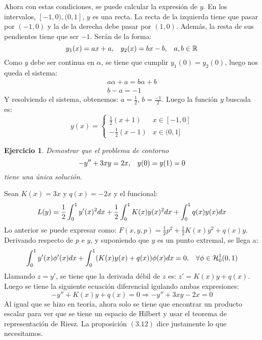 \documentclass[12pt]{article}
\newtheorem{ejercicio}{Ejercicio}
\theoremstyle{definition}
\theoremstyle{remark}
\begin{document}
Ahora con estas condiciones, se puede calcular la expresión de $y$. En los intervalos, $[-1,0),(0,1]$, $y$ es una recta. La recta de la izquierda tiene que pasar por $(-1,0)$ y la de la derecha debe pasar por $(1,0)$. Además, la resta de sus pendientes tiene que ser $-1$. Serán de la forma:
\[
y_1(x)=ax+a, \espacio y_2(x)=bx-b, \espacio a,b\in\R
\]
Como $y$ debe ser continua en $\alpha$, se tiene que cumplir $y_1(0)=y_2(0)$, luego nos queda el sistema:
\[
\begin{array}{l}
a\alpha+a=b\alpha+b\\
b-a=-1
\end{array}
\]
Y resolviendo el sistema, obtenemos: $a=\frac{1}{2}$, $b=\frac{-1}{2}$. Luego la función $y$ buscada es:
\[
y(x)=\left\{
\begin{array}{ll}
\frac{1}{2}(x+1) & x\in[-1,0]\\
-\frac{1}{2}(x-1) & x\in(0,1]
\end{array}
\right.
\]


\begin{ejercicio}
Demostrar que el problema de contorno
\[
-y''+3xy=2x, \espacio y(0)=y(1)=0
\]
tiene una única solución.
\end{ejercicio}


Sean $K(x)=3x$ y $q(x)=-2x$ y el funcional:
\[
L(y)=\frac{1}{2}\integral{0}{1}{y'(x)^2dx}+\frac{1}{2}\integral{0}{1}{K(x)y(x)^2dx}+\integral{0}{1}{q(x)y(x)dx}
\]
Lo anterior se puede expresar como: $F(x,y,p)=\frac{1}{2}p^2+\frac{1}{2}K(x)y^2+q(x)y$. Derivando respecto de $p$ e $y$, y suponiendo que $y$ es un punto extremal, se llega a:
\[
\integral{0}{1}{y'(x)\phi'(x)dx}+\integral{0}{1}{(K(x)y(x)+q(x))\phi(x)dx}=0, \espacio \forall \phi \in \sobolevcero[0,1]{1}
\]
Llamando $z=y'$, se tiene que la derivada débil de $z$ es: $z'=K(x)y+q(x)$. Luego se tiene la siguiente ecuación diferencial igulando ambas expresiones:
\[
-y''+K(x)y+q(x)=0\Rightarrow -y''+3xy-2x=0
\]
Al igual que se hizo en teoría, ahora solo se tiene que encontrar un producto escalar para ver que se tiene un espacio de Hilbert y usar el teorema de representación de Riesz. La proposición $(3.12)$ dice justamente lo que necesitamos.

\end{document}

